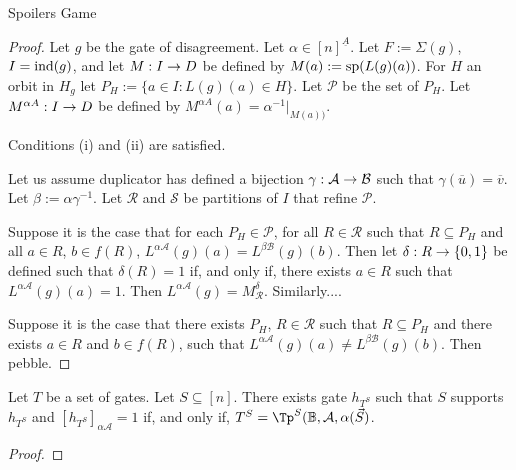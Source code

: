 \documentclass[../main/thesis.tex]{subfiles}
\begin{document}
\begin{lem}
  Spoilers Game
\end{lem}
\begin{proof}
  Let $g$ be the gate of disagreement. Let $\alpha \in [n]^{\underline{A}}$. Let
  $F := \Sigma(g)$, $I = \text{\upshape ind} (g)$, and let $M : I \rightarrow D$ be defined by $M(a) :=
  \text{sp}(L(g)(a))$. For $H$ an orbit in $H_g$ let $P_H := \{a \in I : L(g)(a)
  \in H\}$. Let $\mathcal{P}$ be the set of $P_H$. Let $M^{\alpha{A}} : I \rightarrow D$
  be defined by $M^{\alpha A} (a) = \alpha^{-1} |_{M(a))}$.

  \begin{claim}
    Conditions (i) and (ii) are satisfied.
  \end{claim}

  Let us assume duplicator has defined a bijection $\gamma : \mathcal{A} \rightarrow
  \mathcal{B}$ such that $\gamma (\overline{u}) = \overline{v}$. Let $\beta :=
  \alpha \gamma^{-1}$. Let $\mathcal{R}$ and $\mathcal{S}$ be partitions of $I$
  that refine $\mathcal{P}$.

  Suppose it is the case that for each $P_H \in \mathcal{P}$, for all $R \in
  \mathcal{R}$ such that $R \subseteq P_H$ and all $a \in R$, $b \in f(R)$,
  $L^{\alpha \mathcal{A}}(g)(a) = L^{\beta \mathcal{B}}(g)(b)$. Then let
  $\delta: R \rightarrow \{0,1\}$ be defined such that $\delta (R) = 1$ if, and only if,
  there exists $a \in R$ such that $L^{\alpha \mathcal{A}}(g)(a) = 1$. Then
  $L^{\alpha \mathcal{A}}(g) = M^\delta_{\mathcal{R}}$. Similarly....

  Suppose it is the case that there exists $P_H$, $R \in \mathcal{R}$ such that
  $R \subseteq P_H$ and there exists $a \in R$ and $b \in f(R)$, such that
  $L^{\alpha \mathcal{A}}(g)(a) \neq L^{\beta \mathcal{B}}(g)(b)$. Then pebble.
\end{proof}

\begin{lem}
  Let $T$ be a set of gates. Let $S \subseteq [n]$. There exists gate
  $h_{T^{S}}$ such that $S$ supports $h_{T^S}$ and $[h_{T^S}]_{\alpha
    \mathcal{A}} = 1$ if, and only if, $T^S = \Tp^S(\BB, \mathcal{A},
  \alpha(\vec{S})$.
\end{lem}
\begin{proof}
  
\end{proof}
\end{document}

